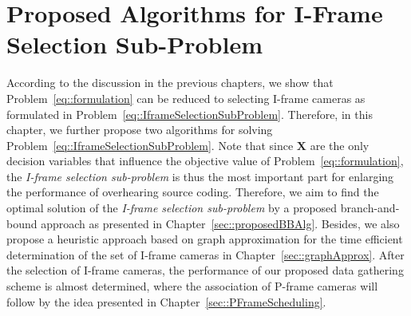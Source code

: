 \section{Proposed Algorithms for I-Frame Selection Sub-Problem}
\label{sec::proposedAlgs}
%
According to the discussion in the previous chapters, we show that Problem~\eqref{eq::formulation} can be reduced to selecting I-frame cameras as formulated in Problem~\eqref{eq::IframeSelectionSubProblem}.
Therefore, in this chapter, we further propose two algorithms for solving Problem~\eqref{eq::IframeSelectionSubProblem}.
Note that since $\mathbf{X}$ are the only decision variables that influence the objective value of Problem~\eqref{eq::formulation}, the \emph{I-frame selection sub-problem} is thus the most important part for enlarging the performance of overhearing source coding.
Therefore, we aim to find the optimal solution of the \emph{I-frame selection sub-problem} by a proposed branch-and-bound approach as presented in Chapter~\ref{sec::proposedBBAlg}.
Besides, we also propose a heuristic approach based on graph approximation for the time efficient determination of the set of I-frame cameras in Chapter~\ref{sec::graphApprox}.
After the selection of I-frame cameras, the performance of our proposed data gathering scheme is almost determined, where the association of P-frame cameras will follow by the idea presented in Chapter~\ref{sec::PFrameScheduling}.

